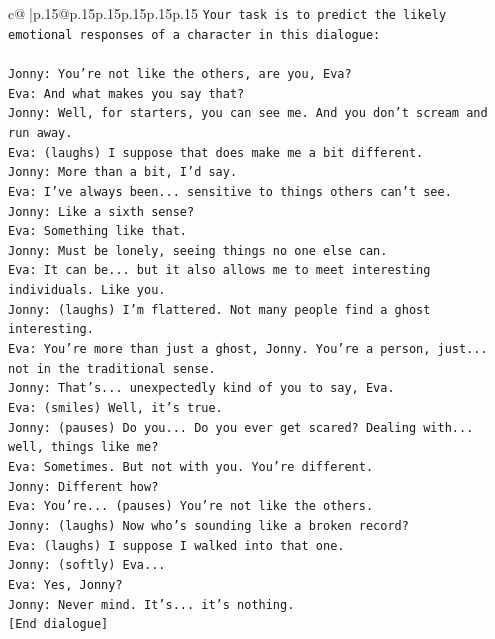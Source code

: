 \documentclass{article}
\begin{document}
{\begin{supertabular}{c@{$\;$}|p{.15\linewidth}@{}p{.15\linewidth}p{.15\linewidth}p{.15\linewidth}p{.15\linewidth}p{.15\linewidth}}
{{{\texttt{Your task is to predict the likely emotional responses of a character in this dialogue:} \\
\\ 
\texttt{Jonny: You're not like the others, are you, Eva?} \\
\texttt{Eva: And what makes you say that?} \\
\texttt{Jonny: Well, for starters, you can see me. And you don't scream and run away.} \\
\texttt{Eva: (laughs) I suppose that does make me a bit different.} \\
\texttt{Jonny: More than a bit, I'd say. } \\
\texttt{Eva: I've always been... sensitive to things others can't see. } \\
\texttt{Jonny: Like a sixth sense?} \\
\texttt{Eva: Something like that. } \\
\texttt{Jonny: Must be lonely, seeing things no one else can.} \\
\texttt{Eva: It can be... but it also allows me to meet interesting individuals. Like you.} \\
\texttt{Jonny: (laughs) I'm flattered. Not many people find a ghost interesting.} \\
\texttt{Eva: You're more than just a ghost, Jonny. You're a person, just... not in the traditional sense.} \\
\texttt{Jonny: That's... unexpectedly kind of you to say, Eva.} \\
\texttt{Eva: (smiles) Well, it's true.} \\
\texttt{Jonny: (pauses) Do you... Do you ever get scared? Dealing with... well, things like me?} \\
\texttt{Eva: Sometimes. But not with you. You're different.} \\
\texttt{Jonny: Different how?} \\
\texttt{Eva: You're... (pauses) You're not like the others.} \\
\texttt{Jonny: (laughs) Now who's sounding like a broken record?} \\
\texttt{Eva: (laughs) I suppose I walked into that one.} \\
\texttt{Jonny: (softly) Eva... } \\
\texttt{Eva: Yes, Jonny?} \\
\texttt{Jonny: Never mind. It's... it's nothing.} \\
\texttt{{[}End dialogue{]}} \\
}}}
\end{supertabular}}
\end{document}
